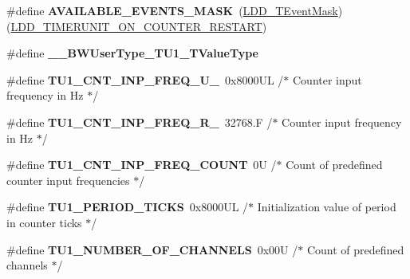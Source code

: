 \begin{DoxyCompactItemize}
\item 
\mbox{\label{group___t_u1__module_ga5f04a8830cd52a3ffa1678d113f31aee}} 
\#define {\bfseries A\+V\+A\+I\+L\+A\+B\+L\+E\+\_\+\+E\+V\+E\+N\+T\+S\+\_\+\+M\+A\+SK}~(\hyperlink{group___p_e___types__module_gafbe7f4d4e51560399c3bdd0218584533}{L\+D\+D\+\_\+\+T\+Event\+Mask})(\hyperlink{group___p_e___types__module_gae8e6bf9d76916611a08b76f20ceb1ef7}{L\+D\+D\+\_\+\+T\+I\+M\+E\+R\+U\+N\+I\+T\+\_\+\+O\+N\+\_\+\+C\+O\+U\+N\+T\+E\+R\+\_\+\+R\+E\+S\+T\+A\+RT})
\item 
\mbox{\label{group___t_u1__module_gaf0b58bf613a080724fc73a1d8b13ff39}} 
\#define {\bfseries \+\_\+\+\_\+\+B\+W\+User\+Type\+\_\+\+T\+U1\+\_\+\+T\+Value\+Type}
\item 
\mbox{\label{group___t_u1__module_ga85cc4897457440a2308166668f49da10}} 
\#define {\bfseries T\+U1\+\_\+\+C\+N\+T\+\_\+\+I\+N\+P\+\_\+\+F\+R\+E\+Q\+\_\+\+U\+\_}~0x8000\+U\+L  /$\ast$ Counter input frequency in Hz $\ast$/
\item 
\mbox{\label{group___t_u1__module_ga4913c95039859613c2db9d00795ab5d6}} 
\#define {\bfseries T\+U1\+\_\+\+C\+N\+T\+\_\+\+I\+N\+P\+\_\+\+F\+R\+E\+Q\+\_\+\+R\+\_}~32768.\+F /$\ast$ Counter input frequency in Hz $\ast$/
\item 
\mbox{\label{group___t_u1__module_ga855f7e71146b18903d56643ec80c5ddb}} 
\#define {\bfseries T\+U1\+\_\+\+C\+N\+T\+\_\+\+I\+N\+P\+\_\+\+F\+R\+E\+Q\+\_\+\+C\+O\+U\+NT}~0\+U      /$\ast$ Count of predefined counter input frequencies $\ast$/
\item 
\mbox{\label{group___t_u1__module_ga17e6ec4b6bb1df9067daf9ac4204db66}} 
\#define {\bfseries T\+U1\+\_\+\+P\+E\+R\+I\+O\+D\+\_\+\+T\+I\+C\+KS}~0x8000\+U\+L    /$\ast$ Initialization value of period in \textquotesingle{}counter ticks\textquotesingle{} $\ast$/
\item 
\mbox{\label{group___t_u1__module_ga15dbabf955f2e2b0f888b98320eabfa3}} 
\#define {\bfseries T\+U1\+\_\+\+N\+U\+M\+B\+E\+R\+\_\+\+O\+F\+\_\+\+C\+H\+A\+N\+N\+E\+LS}~0x00\+U   /$\ast$ Count of predefined channels $\ast$/

\end{DoxyCompactItemize}
